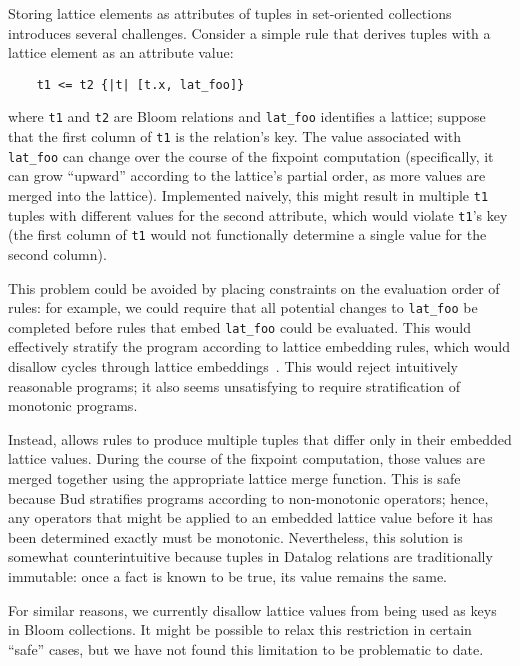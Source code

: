 Storing lattice elements as attributes of tuples in set-oriented collections
introduces several challenges. Consider a simple \lang rule that derives tuples
with a lattice element as an attribute value:
\begin{verbatim}
    t1 <= t2 {|t| [t.x, lat_foo]}
\end{verbatim}
where \texttt{t1} and \texttt{t2} are Bloom relations and \texttt{lat\_foo}
identifies a lattice; suppose that the first column of \texttt{t1} is the
relation's key. The value associated with \texttt{lat\_foo} can change over the
course of the fixpoint computation (specifically, it can grow ``upward''
according to the lattice's partial order, as more values are merged into the
lattice). Implemented naively, this might result in multiple \texttt{t1} tuples
with different values for the second attribute, which would violate
\texttt{t1}'s key (the first column of \texttt{t1} would not functionally
determine a single value for the second column).

This problem could be avoided by placing constraints on the evaluation order of
rules: for example, we could require that all potential changes to
\texttt{lat\_foo} be completed before rules that embed \texttt{lat\_foo} could
be evaluated. This would effectively stratify the program according to lattice
embedding rules, which would disallow cycles through lattice
embeddings~\cite{Apt1988}. This would reject intuitively reasonable programs; it
also seems unsatisfying to require stratification of monotonic programs.

Instead, \lang allows rules to produce multiple tuples that differ only in their
embedded lattice values. During the course of the fixpoint computation, those
values are merged together using the appropriate lattice merge function. This is
safe because Bud stratifies programs according to non-monotonic operators;
hence, any operators that might be applied to an embedded lattice value before
it has been determined exactly must be monotonic. Nevertheless, this solution is
somewhat counterintuitive because tuples in Datalog relations are traditionally
immutable: once a fact is known to be true, its value remains the
same.%

For similar reasons, we currently disallow lattice values from being used as
keys in Bloom collections. It might be possible to relax this restriction in
certain ``safe'' cases, but we have not found this limitation to be problematic
to date.
